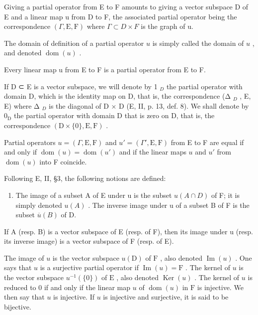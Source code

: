 Giving a partial operator from E to F amounts to giving a vector subspace D of E and a linear map u from D to F, the associated partial operator being the correspondence \((\Gamma, \mathrm{E}, \mathrm{F})\) where \(\Gamma \subset D \times F\) is the graph of u.

The domain of definition of a partial operator \(u\) is simply called the domain of \(u\) , and denoted \(\operatorname{dom}(u)\) .

Every linear map u from E to F is a partial operator from E to F.

If D ⊂ E is a vector subspace, we will denote by 1 \(_{D}\) the partial operator with domain D, which is the identity map on D, that is, the correspondence (Δ \(_{D}\) , E, E) where Δ \(_{D}\) is the diagonal of D × D (E, II, p. 13, def. 8). We shall denote by \(0_{\mathrm{D}}\) the partial operator with domain D that is zero on D, that is, the correspondence \((\mathrm{D} \times \{0\}, \mathrm{E}, \mathrm{F})\) .

Partial operators \(u = (\Gamma, \mathrm{E}, \mathrm{F})\) and \(u' = (\Gamma', \mathrm{E}, \mathrm{F})\) from E to F are equal if and only if \(\operatorname{dom}(u) = \operatorname{dom}(u')\) and if the linear maps \(u\) and \(u'\) from \(\operatorname{dom}(u)\) into F coincide.

Following E, II, §3, the following notions are defined:

\begin{enumerate}
\def\labelenumi{(\roman{enumi})}
\tightlist
\item
  The image of a subset A of E under u is the subset \(u(A \cap D)\) of F; it is simply denoted \(u(A)\) . The inverse image under u of a subset B of F is the subset \(\overline{u}(B)\) of D.
\end{enumerate}

If A (resp. B) is a vector subspace of E (resp. of F), then its image under u (resp. its inverse image) is a vector subspace of F (resp. of E).

The image of \(u\) is the vector subspace \(u(\mathrm{D})\) of \(\mathrm{F}\) , also denoted \(\operatorname{Im}(u)\) . One says that \(u\) is a surjective partial operator if \(\operatorname{Im}(u) = \mathrm{F}\) . The kernel of \(u\) is the vector subspace \(u^{-1}(\{0\})\) of \(\mathrm{E}\) , also denoted \(\operatorname{Ker}(u)\) . The kernel of \(u\) is reduced to 0 if and only if the linear map \(u\) of \(\operatorname{dom}(u)\) in \(\mathrm{F}\) is injective. We then say that \(u\) is injective. If \(u\) is injective and surjective, it is said to be bijective.

